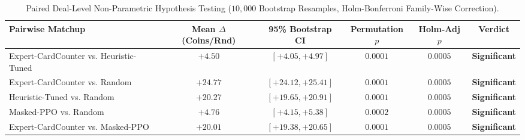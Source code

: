 \begin{table}[t]
\centering
\caption{Paired Deal-Level Non-Parametric Hypothesis Testing ($10{,}000$ Bootstrap Resamples, Holm-Bonferroni Family-Wise Correction).}
\label{tab:hypothesis_testing}
\small
\begin{tabular}{lccccc}
\toprule
\textbf{Pairwise Matchup} & \textbf{Mean $\Delta$ (Coins/Rnd)} & \textbf{95\% Bootstrap CI} & \textbf{Permutation $p$} & \textbf{Holm-Adj $p$} & \textbf{Verdict} \\
\midrule
Expert-CardCounter vs. Heuristic-Tuned & $+4.50$ & $[+4.05, +4.97]$ & $0.0001$ & $0.0005$ & \textbf{Significant} \\
Expert-CardCounter vs. Random          & $+24.77$ & $[+24.12, +25.41]$ & $0.0001$ & $0.0005$ & \textbf{Significant} \\
Heuristic-Tuned vs. Random             & $+20.27$ & $[+19.65, +20.91]$ & $0.0001$ & $0.0005$ & \textbf{Significant} \\
Masked-PPO vs. Random                  & $+4.76$ & $[+4.15, +5.38]$ & $0.0002$ & $0.0005$ & \textbf{Significant} \\
Expert-CardCounter vs. Masked-PPO      & $+20.01$ & $[+19.38, +20.65]$ & $0.0001$ & $0.0005$ & \textbf{Significant} \\
\bottomrule
\end{tabular}
\end{table}
